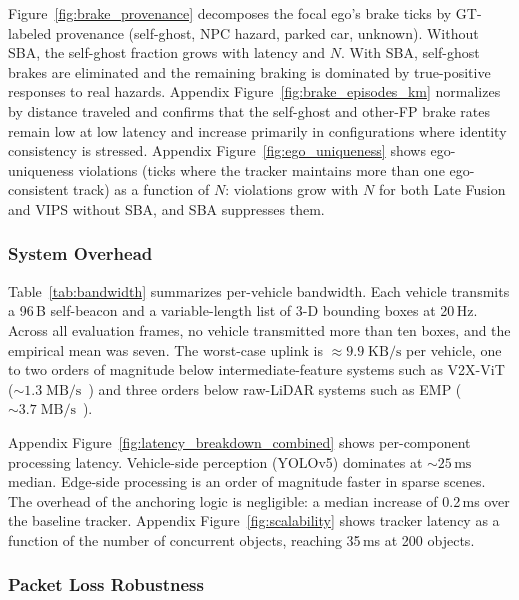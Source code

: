 Figure~\ref{fig:brake_provenance} decomposes the focal ego's brake ticks by GT-labeled provenance (self-ghost, NPC hazard, parked car, unknown). Without SBA, the self-ghost fraction grows with latency and $N$. With SBA, self-ghost brakes are eliminated and the remaining braking is dominated by true-positive responses to real hazards. Appendix Figure~\ref{fig:brake_episodes_km} normalizes by distance traveled and confirms that the self-ghost and other-FP brake rates remain low at low latency and increase primarily in configurations where identity consistency is stressed. Appendix Figure~\ref{fig:ego_uniqueness} shows ego-uniqueness violations (ticks where the tracker maintains more than one ego-consistent track) as a function of $N$: violations grow with $N$ for both Late Fusion and VIPS without SBA, and SBA suppresses them.



\subsubsection{System Overhead}
\label{sec:eval:overhead}

Table~\ref{tab:bandwidth} summarizes per-vehicle bandwidth. Each vehicle transmits a 96\,B self-beacon and a variable-length list of 3-D bounding boxes at 20\,Hz. Across all evaluation frames, no vehicle transmitted more than ten boxes, and the empirical mean was seven. The worst-case uplink is ${\approx}9.9\;\mathrm{KB/s}$ per vehicle, one to two orders of magnitude below intermediate-feature systems such as V2X-ViT (${\sim}1.3\;\mathrm{MB/s}$~\cite{v2xvit2022}) and three orders below raw-LiDAR systems such as EMP (${\sim}3.7\;\mathrm{MB/s}$~\cite{EMP}).

Appendix Figure~\ref{fig:latency_breakdown_combined} shows per-component processing latency. Vehicle-side perception (YOLOv5) dominates at ${\sim}25\,\mathrm{ms}$ median. Edge-side processing is an order of magnitude faster in sparse scenes. The overhead of the anchoring logic is negligible: a median increase of 0.2\,ms over the baseline tracker. Appendix Figure~\ref{fig:scalability} shows tracker latency as a function of the number of concurrent objects, reaching 35\,ms at 200 objects.



\subsubsection{Packet Loss Robustness}
\label{sec:eval:loss}

